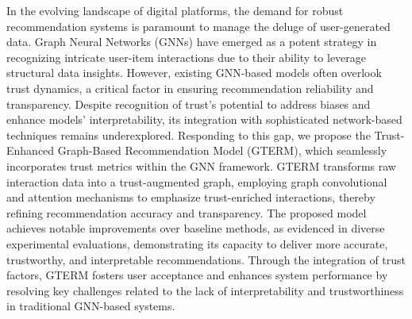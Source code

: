 

In the evolving landscape of digital platforms, the demand for robust recommendation systems is paramount to manage the deluge of user-generated data. Graph Neural Networks (GNNs) have emerged as a potent strategy in recognizing intricate user-item interactions due to their ability to leverage structural data insights. However, existing GNN-based models often overlook trust dynamics, a critical factor in ensuring recommendation reliability and transparency. Despite recognition of trust's potential to address biases and enhance models' interpretability, its integration with sophisticated network-based techniques remains underexplored. Responding to this gap, we propose the Trust-Enhanced Graph-Based Recommendation Model (GTERM), which seamlessly incorporates trust metrics within the GNN framework. GTERM transforms raw interaction data into a trust-augmented graph, employing graph convolutional and attention mechanisms to emphasize trust-enriched interactions, thereby refining recommendation accuracy and transparency. The proposed model achieves notable improvements over baseline methods, as evidenced in diverse experimental evaluations, demonstrating its capacity to deliver more accurate, trustworthy, and interpretable recommendations. Through the integration of trust factors, GTERM fosters user acceptance and enhances system performance by resolving key challenges related to the lack of interpretability and trustworthiness in traditional GNN-based systems.
